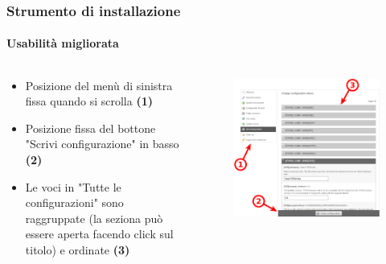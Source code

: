 
\begin{frame}[fragile]
	\frametitle{Strumento di installazione}
	\framesubtitle{Usabilità migliorata}

	\begin{columns}[T]
		\begin{column}{.5\textwidth}

			\begin{itemize}
				\item Posizione del menù di sinistra fissa quando si scrolla
					\begingroup\color{typo3red}\textbf{(1)}\endgroup
				\item Posizione fissa del bottone "Scrivi configurazione" in basso
					\begingroup\color{typo3red}\textbf{(2)}\endgroup
				\item Le voci in "Tutte le configurazioni" sono raggruppate (la seziona può essere aperta facendo click sul titolo) e ordinate
					\begingroup\color{typo3red}\textbf{(3)}\endgroup
			\end{itemize}

		\end{column}
		\begin{column}{.5\textwidth}

			\begin{figure}\vspace*{-0.4cm}
				\includegraphics[width=0.8\linewidth]{Images/InstallTool/ImprovedUsability.png}
			\end{figure}

		\end{column}
	\end{columns}

\end{frame}

